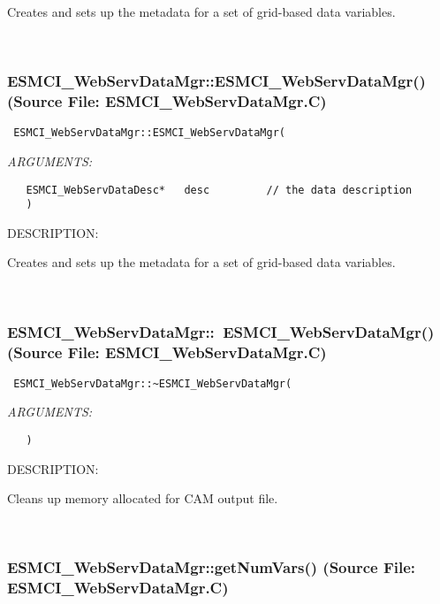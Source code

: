       Creates and sets up the metadata for a set of grid-based data variables.
   
 
\mbox{}\hrulefill\
 
\subsubsection{ESMCI\_WebServDataMgr::ESMCI\_WebServDataMgr() (Source File: ESMCI\_WebServDataMgr.C)}


  
\begin{verbatim} ESMCI_WebServDataMgr::ESMCI_WebServDataMgr(\end{verbatim}{\em ARGUMENTS:}
\begin{verbatim}   ESMCI_WebServDataDesc*   desc         // the data description
   )\end{verbatim}
{\sf DESCRIPTION:\\ }


      Creates and sets up the metadata for a set of grid-based data variables.
   
 
\mbox{}\hrulefill\
 
\subsubsection{ESMCI\_WebServDataMgr::~ESMCI\_WebServDataMgr() (Source File: ESMCI\_WebServDataMgr.C)}


  
\begin{verbatim} ESMCI_WebServDataMgr::~ESMCI_WebServDataMgr(\end{verbatim}{\em ARGUMENTS:}
\begin{verbatim}   )\end{verbatim}
{\sf DESCRIPTION:\\ }


      Cleans up memory allocated for CAM output file.
   
 
\mbox{}\hrulefill\
 
\subsubsection{ESMCI\_WebServDataMgr::getNumVars() (Source File: ESMCI\_WebServDataMgr.C)}


